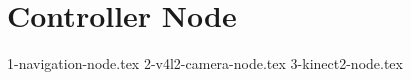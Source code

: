 \section{Controller Node}
\label{sec:controllernode}

\textcolor{red}{\lipsum[1-2]}

{1-navigation-node.tex}
{2-v4l2-camera-node.tex}
{3-kinect2-node.tex}
